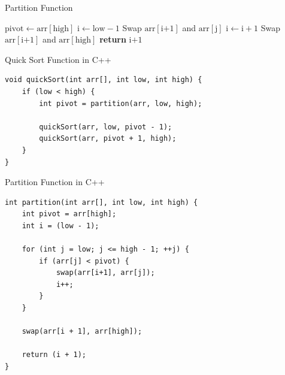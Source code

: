 \begin{frame}{Partition Function}
    \begin{algorithm}[H]
        \caption{Partition}
        \begin{algorithmic}[1]
                \State $\text{pivot} \gets \text{arr}[\text{high}]$
                \State $\text{i} \gets \text{low} - 1$
                        \State Swap $\text{arr}[\text{i+1}]$ and $\text{arr}[\text{j}]$
                        \State $\text{i} \gets \text{i} + 1$
                    \EndIf
                \EndFor
                \State Swap $\text{arr}[\text{i+1}]$ and $\text{arr}[\text{high}]$
                \State \textbf{return} $\text{i+1}$
            \EndFunction
        \end{algorithmic}
    \end{algorithm}
\end{frame}



\begin{frame}[fragile]{Quick Sort Function in C++}
    \begin{lstlisting}[style=cppStyle]
void quickSort(int arr[], int low, int high) {
    if (low < high) {
        int pivot = partition(arr, low, high);

        quickSort(arr, low, pivot - 1);
        quickSort(arr, pivot + 1, high);
    }
}
    \end{lstlisting}
\end{frame}

\begin{frame}[fragile]{Partition Function in C++}
    \begin{lstlisting}[style=cppStyle]
int partition(int arr[], int low, int high) {
    int pivot = arr[high];
    int i = (low - 1);

    for (int j = low; j <= high - 1; ++j) {
        if (arr[j] < pivot) {
            swap(arr[i+1], arr[j]);
            i++;
        }
    }

    swap(arr[i + 1], arr[high]);

    return (i + 1);
}
    \end{lstlisting}
\end{frame}



